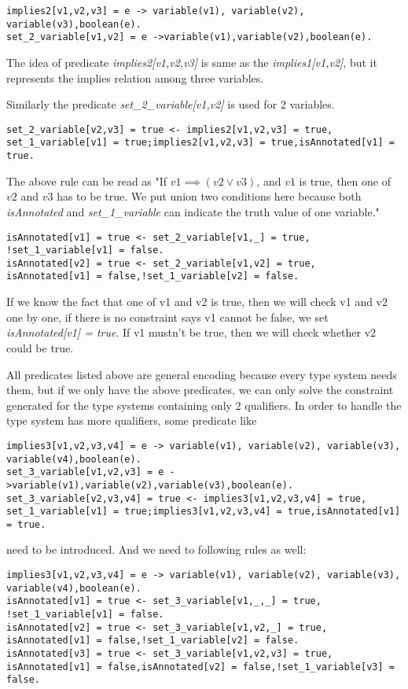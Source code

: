 \documentclass[11pt]{article}
\begin{document}
\begin{lstlisting}
implies2[v1,v2,v3] = e -> variable(v1), variable(v2), variable(v3),boolean(e).
set_2_variable[v1,v2] = e ->variable(v1),variable(v2),boolean(e).
\end{lstlisting} 
\par The idea of predicate \textit{implies2[v1,v2,v3]} is same as the \textit{implies1[v1,v2]}, but it represents the implies relation among three variables.
\par Similarly the predicate \textit{set\_2\_variable[v1,v2]} is used for 2 variables.

\begin{lstlisting}
set_2_variable[v2,v3] = true <- implies2[v1,v2,v3] = true, set_1_variable[v1] = true;implies2[v1,v2,v3] = true,isAnnotated[v1] = true.
\end{lstlisting}
\par The above rule can be read as "If $v1\implies (v2 \vee v3)$, and $v1$ is true, then one of $v2$ and $v3$ has to be true. We put union two conditions here because both \textit{isAnnotated} and \textit{set\_1\_variable} can indicate the truth value of one variable."

 \begin{lstlisting}
isAnnotated[v1] = true <- set_2_variable[v1,_] = true, !set_1_variable[v1] = false.
isAnnotated[v2] = true <- set_2_variable[v1,v2] = true, isAnnotated[v1] = false,!set_1_variable[v2] = false.
\end{lstlisting}
\par If we know the fact that one of v1 and v2 is true, then we will check v1 and v2 one by one, if there is no constraint says v1 cannot be false, we set \textit{isAnnotated[v1] = true}. If v1 mustn't be true, then we will check whether v2 could be true.
 
\par All predicates listed above are general encoding because every type system needs them, but if we only have the above predicates, we can only solve the constraint generated for the type systems containing only 2 qualifiers. In order to handle the type system has more qualifiers, some predicate like 
 \begin{lstlisting}
implies3[v1,v2,v3,v4] = e -> variable(v1), variable(v2), variable(v3), variable(v4),boolean(e).
set_3_variable[v1,v2,v3] = e ->variable(v1),variable(v2),variable(v3),boolean(e).
set_3_variable[v2,v3,v4] = true <- implies3[v1,v2,v3,v4] = true, set_1_variable[v1] = true;implies3[v1,v2,v3,v4] = true,isAnnotated[v1] = true.
\end{lstlisting}
need to be introduced. And we need to following rules as well:
 \begin{lstlisting}
implies3[v1,v2,v3,v4] = e -> variable(v1), variable(v2), variable(v3), variable(v4),boolean(e).
isAnnotated[v1] = true <- set_3_variable[v1,_,_] = true, !set_1_variable[v1] = false.
isAnnotated[v2] = true <- set_3_variable[v1,v2,_] = true, isAnnotated[v1] = false,!set_1_variable[v2] = false.
isAnnotated[v3] = true <- set_3_variable[v1,v2,v3] = true, isAnnotated[v1] = false,isAnnotated[v2] = false,!set_1_variable[v3] = false.
\end{lstlisting}
\end{document}
